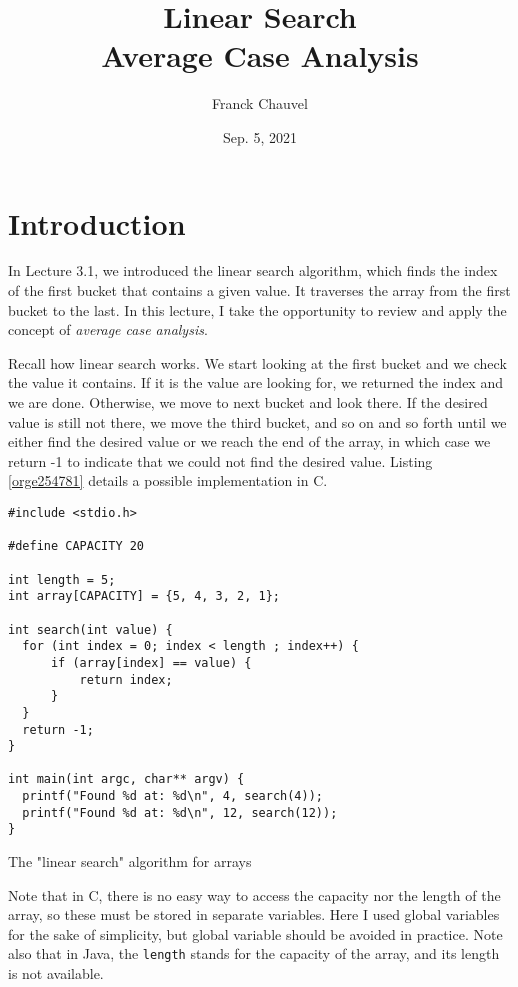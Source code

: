 \documentclass[11pt]{article}
\author{Franck Chauvel}
\date{Sep. 5, 2021}
\title{Linear Search\\\medskip
\large Average Case Analysis}
\begin{document}
\maketitle
\tableofcontents


\section{Introduction}
\label{sec:org468ffc8}

In Lecture 3.1, we introduced the linear search algorithm, which
finds the index of the first bucket that contains a given value. It
traverses the array from the first bucket to the last. In this
lecture, I take the opportunity to review and apply the concept of
\emph{average case analysis}.

Recall how linear search works. We start looking at the first bucket
and we check the value it contains. If it is the value are looking
for, we returned the index and we are done. Otherwise, we move to
next bucket and look there. If the desired value is still not there,
we move the third bucket, and so on and so forth until we either
find the desired value or we reach the end of the array, in which
case we return -1 to indicate that we could not find the desired
value. Listing \ref{orge254781} details a possible implementation
in C.

\begin{listing}[htbp]
\begin{verbatim}
#include <stdio.h>

#define CAPACITY 20

int length = 5;
int array[CAPACITY] = {5, 4, 3, 2, 1};

int search(int value) {
  for (int index = 0; index < length ; index++) {
      if (array[index] == value) {
          return index;
      }
  }
  return -1;
}

int main(int argc, char** argv) {
  printf("Found %d at: %d\n", 4, search(4));
  printf("Found %d at: %d\n", 12, search(12));
}
\end{verbatim}
\caption{\label{orge254781}The "linear search" algorithm for arrays}
\end{listing}

Note that in C, there is no easy way to access the capacity nor the
length of the array, so these must be stored in separate variables.
Here I used global variables for the sake of simplicity, but global
variable should be avoided in practice. Note also that in Java, the
\texttt{length} stands for the capacity of the array, and its length is not
available.
\end{document}
